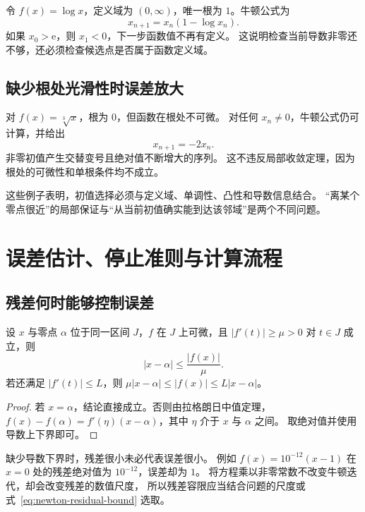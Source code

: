 \documentclass{ctexart}
\begin{document}
令 $f(x)=\log x$，定义域为 $(0,\infty)$，唯一根为 $1$。牛顿公式为
\[
  x_{n+1}=x_n(1-\log x_n).
\]
如果 $x_0>\mathrm e$，则 $x_1<0$，下一步函数值不再有定义。
这说明检查当前导数非零还不够，还必须检查候选点是否属于函数定义域。

\subsection{缺少根处光滑性时误差放大}

对 $f(x)=\sqrt[3]{x}$，根为 $0$，但函数在根处不可微。
对任何 $x_n\ne0$，牛顿公式仍可计算，并给出
\[
  x_{n+1}=-2x_n.
\]
非零初值产生交替变号且绝对值不断增大的序列。
这不违反局部收敛定理，因为根处的可微性和单根条件均不成立。

这些例子表明，初值选择必须与定义域、单调性、凸性和导数信息结合。
“离某个零点很近”的局部保证与“从当前初值确实能到达该邻域”是两个不同问题。

\section{误差估计、停止准则与计算流程}
\label{sec:newton-stopping}

\subsection{残差何时能够控制误差}

\begin{proposition}[由残差估计误差]\label{prop:newton-residual}
设 $x$ 与零点 $\alpha$ 位于同一区间 $J$，$f$ 在 $J$ 上可微，且
$|f'(t)|\ge\mu>0$ 对 $t\in J$ 成立，则
\begin{equation}\label{eq:newton-residual-bound}
  |x-\alpha|\le\frac{|f(x)|}{\mu}.
\end{equation}
若还满足 $|f'(t)|\le L$，则 $\mu|x-\alpha|\le|f(x)|\le L|x-\alpha|$。
\end{proposition}

\begin{proof}
若 $x=\alpha$，结论直接成立。否则由拉格朗日中值定理，
$f(x)-f(\alpha)=f'(\eta)(x-\alpha)$，其中 $\eta$ 介于 $x$ 与 $\alpha$ 之间。
取绝对值并使用导数上下界即可。
\end{proof}

缺少导数下界时，残差很小未必代表误差很小。
例如 $f(x)=10^{-12}(x-1)$ 在 $x=0$ 处的残差绝对值为 $10^{-12}$，误差却为 $1$。
将方程乘以非零常数不改变牛顿迭代，却会改变残差的数值尺度，
所以残差容限应当结合问题的尺度或式~\eqref{eq:newton-residual-bound} 选取。
\end{document}
